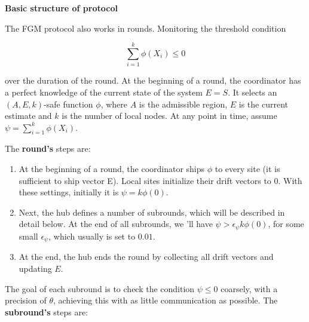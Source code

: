 {\large \textbf{Basic structure of protocol}}

The FGM protocol also works in rounds.
Monitoring the threshold condition

\begin{equation}
    \sum_{i=1}^{k} \phi(X_i) \leq 0\label{eq:equation34}
\end{equation}

over the duration of the round.
At the beginning of a round, the coordinator has a perfect knowledge of the current state of the system $E = S$.
It selects an $(A, E, k)$-safe function $\phi$, where $A$ is the admissible region, $E$ is the current estimate and $k$ is the number of local nodes.
At any point in time, assume $\psi = \sum_{i=1}^{k} \phi(X_i)$.

The \textbf{round's} steps are:

\begin{enumerate}
    \item At the beginning of a round, the coordinator ships $\phi$ to every site (it is sufficient to ship vector E).
    Local sites initialize their drift vectors to 0.
    With these settings, initially it is $\psi = k \phi(0)$.
    \item Next, the hub defines a number of subrounds, which will be described in detail below.
    At the end of all subrounds, we 'll have $\psi > \epsilon_\psi k \phi(0)$, for some small $\epsilon_\psi$, which usually is set to $0.01$.
    \item At the end, the hub ends the round by collecting all drift vectors and updating $E$.
\end{enumerate}

The goal of each subround is to check the condition $\psi \leq 0$ coarsely, with a precision of $\theta$, achieving this with as little communication as possible.
The \textbf{subround's} steps are:

